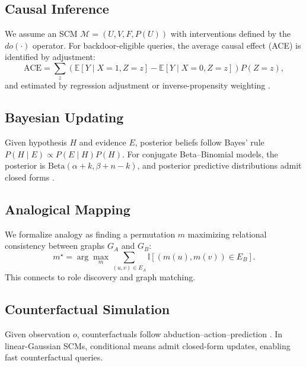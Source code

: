 \documentclass[11pt]{article}
\begin{document}
\subsection{Causal Inference}
We assume an SCM $\mathcal{M}=(U,V,F,P(U))$ with interventions defined by the $do(\cdot)$ operator. For backdoor-eligible queries, the average causal effect (ACE) is identified by adjustment:
\begin{equation}
\mathrm{ACE} = \sum_{z} \left( \mathbb{E}[Y \mid X{=}1,Z{=}z] - \mathbb{E}[Y \mid X{=}0,Z{=}z] \right) P(Z{=}z),
\end{equation}
and estimated by regression adjustment or inverse-propensity weighting \citep{peters2017elements}.

\subsection{Bayesian Updating}
Given hypothesis $H$ and evidence $E$, posterior beliefs follow Bayes' rule $P(H\!\mid\!E)\propto P(E\!\mid\!H)P(H)$. For conjugate Beta--Binomial models, the posterior is $\mathrm{Beta}(\alpha{+}k,\beta{+}n{-}k)$, and posterior predictive distributions admit closed forms \citep{gelman2013bayesian}.

\subsection{Analogical Mapping}
We formalize analogy as finding a permutation $m$ maximizing relational consistency between graphs $G_A$ and $G_B$:
\begin{equation}
m^\star = \arg\max_{m} \sum_{(u,v)\in E_A} \mathbb{I}\!\left[(m(u),m(v))\in E_B\right].
\end{equation}
This connects to role discovery and graph matching.

\subsection{Counterfactual Simulation}
Given observation $o$, counterfactuals follow abduction--action--prediction \citep{pearl2009causality}. In linear-Gaussian SCMs, conditional means admit closed-form updates, enabling fast counterfactual queries.
\end{document}
